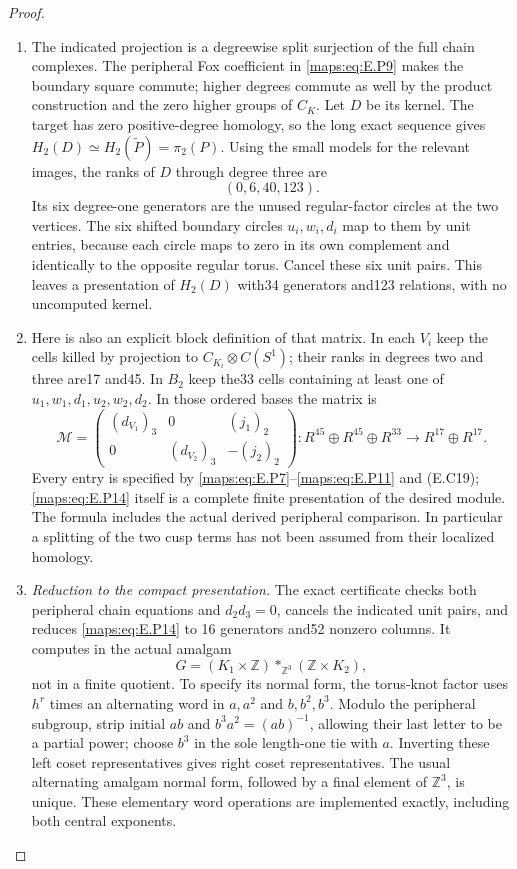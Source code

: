\begin{proof}
\begin{enumerate}[label=\arabic*.,leftmargin=*]
\item The indicated projection is a degreewise split
surjection of the full chain complexes. The
peripheral Fox coefficient in \eqref{maps:eq:E.P9} makes the
boundary square commute; higher degrees commute
as well by the product construction and the
zero higher groups of $C_K$. Let $D$ be its kernel.
The target has zero positive-degree homology, so
the long exact sequence gives
$H_2(D)\simeq H_2(\widetilde P)=\pi_2(P)$.
Using the small models for the relevant images,
the ranks of $D$ through degree three are
\[
                         (0,6,40,123).
 \tag{E.P13}\label{maps:eq:E.P13}
\]
Its six degree-one generators are the unused
regular-factor circles at the two vertices.
The six shifted boundary circles $u_i,w_i,d_i$
map to them by unit entries, because each circle
maps to zero in its own complement and identically
to the opposite regular torus. Cancel these six
unit pairs. This leaves a presentation of $H_2(D)$
with34 generators and123 relations, with no
uncomputed kernel.

\item Here is also an explicit block definition of that
matrix. In each $V_i$ keep the cells killed by
projection to $C_{K_i}\otimes C(S^1)$; their ranks
in degrees two and three are17 and45. In $B_2$
keep the33 cells containing at least one of
$u_1,w_1,d_1,u_2,w_2,d_2$. In those ordered bases
the matrix is
\[
 \mathcal M=
 \begin{pmatrix}
 (d_{V_1})_3&0&(j_1)_2\\
 0&(d_{V_2})_3&-(j_2)_2
 \end{pmatrix}:
 R^{45}\oplus R^{45}\oplus R^{33}
             \longrightarrow R^{17}\oplus R^{17}.
 \tag{E.P14}\label{maps:eq:E.P14}
\]
Every entry is specified by \eqref{maps:eq:E.P7}--\eqref{maps:eq:E.P11} and
(E.C19); \eqref{maps:eq:E.P14} itself is a complete finite
presentation of the desired module. The formula
includes the actual derived peripheral comparison.
In particular a splitting of the two cusp terms
has not been assumed from their localized homology.

\item \emph{Reduction to the compact presentation.}
The exact certificate
 checks both
peripheral chain equations and $d_2d_3=0$, cancels
the indicated unit pairs, and reduces \eqref{maps:eq:E.P14} to
16 generators and52 nonzero columns. It computes
in the actual amalgam
\[
 G=(K_1\times\mathbb Z)\mathop{*}_{\mathbb Z^3}
                                      (\mathbb Z\times K_2),
 \tag{E.P15}\label{maps:eq:E.P15}
\]
not in a finite quotient. To specify its normal
form, the torus-knot factor uses $h^r$ times an
alternating word in $a,a^2$ and $b,b^2,b^3$.
Modulo the peripheral subgroup, strip initial
$ab$ and $b^3a^2=(ab)^{-1}$, allowing their last
letter to be a partial power; choose $b^3$ in
the sole length-one tie with $a$. Inverting these
left coset representatives gives right coset
representatives. The usual alternating amalgam
normal form, followed by a final element of
$\mathbb Z^3$, is unique. These elementary word
operations are implemented exactly, including
both central exponents.


\end{enumerate}
\end{proof}
